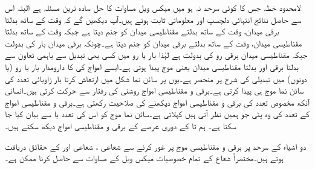 لامحدود خطہ جس کا کوئی سرحد نہ ہو میں میکس ویل مساوات کا حل سادہ ترین مسئلہ ہے البتہ اس سے حاصل نتائج انتہائی دلچسپ اور معلوماتی ثابت ہوتے ہیں۔آپ دیکھیں گے کہ وقت کے ساتھ بدلتا برقی میدان، وقت کے ساتھ بدلتے مقناطیسی میدان کو جنم دیتا ہے جبکہ وقت کے ساتھ بدلتا مقناطیسی میدان، وقت کے ساتھ بدلتے برقی میدان کو جنم دیتا ہے۔چونکہ برقی میدان بار کی بدولت جبکہ مقناطیسی میدان برقی رو کی بدولت ہے لہٰذا بار یا رو میں کسی بھی تبدیل سے  باہمی تعاون سے بدلتا برقی اور بدلتا مقناطیسی میدان یعنی  موج پیدا ہوتی ہے۔ایسے امواج کی  کا دارومدار بار یا رو (یا دونوں) میں تبدیلی کی شرح پر منحصر ہے۔یوں   پر سائن نما شکل میں ارتعاش کرتا بار  زاویائی تعدد کی سائن نما موج ہی پیدا کرتی ہے۔برقی و مقناطیسی امواج  روشنی کی رفتار سے حرکت کرتی ہیں۔انسانی آنکھ مخصوص تعدد کی برقی و مقناطیسی امواج دیکھنے کی صلاحیت رکھتی ہے۔برقی و مقناطیسی امواج کے تعدد کی وہ پٹی جو ہمیں نظر آتی ہیں  کہلاتی ہے۔سائن نما موج کو اس کی تعدد  یا   سے بیان کیا جا سکتا ہے۔ ہم  تا  کے دوری عرصے کے برقی و مقناطیسی امواج دیکھ سکتے ہیں۔

دو اشیاء کے سرحد پر برقی و مقناطیسی موج پر غور کرنے سے  شعاعی ، شعاعی  اور   کے حقائق دریافت ہوتے ہیں۔مختصراً شعاع کے تمام خصوصیات میکس ویل کے مساوات سے حاصل کرنا ممکن ہے۔

